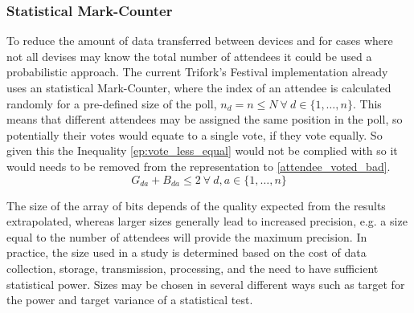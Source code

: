 \subsubsection{Statistical Mark-Counter} \label{sec:stat_mark_counter}
To reduce the amount of data transferred between devices and for cases where not all devises may know the total number of attendees it could be used a probabilistic approach. The current Trifork's Festival implementation already uses an statistical Mark-Counter, where the index of an attendee is calculated randomly for a pre-defined size of the poll, $n_{d} = n \le N ~ \forall ~ d \in \{1,\dots, n\}$. This means that different attendees may be assigned the same position in the poll, so potentially their votes would equate to a single vote, if they vote equally. So given this the Inequality \ref{ep:vote_less_equal} would not be complied with so it would needs to be removed from the representation to \ref{attendee_voted_bad}.
\begin{equation} \label{ep:vote_less_equal}
	G_{da} + B_{da} \le 2 ~ \forall ~ d, a \in \{1,\dots, n\}
\end{equation}

The size of the array of bits depends of the quality expected from the results extrapolated, whereas larger sizes generally lead to increased precision, e.g. a size equal to the number of attendees will provide the maximum precision. In practice, the size used in a study is determined based on the cost of data collection, storage, transmission, processing, and the need to have sufficient statistical power. Sizes may be chosen in several different ways such as target for the power and target variance of a statistical test.
